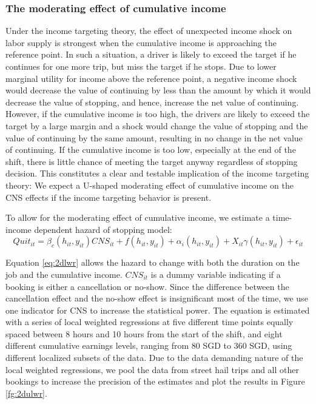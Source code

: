 \documentclass[reviewmode,AEJ]{AEA}
\begin{document}
\subsubsection{The moderating effect of cumulative income} Under the income targeting theory, the effect of unexpected income shock on labor supply is strongest when the cumulative income is approaching the reference point. In such a situation, a driver is likely to exceed the target if he continues for one more trip, but  miss the target if he stops. Due to lower marginal utility for income above the reference point, a negative income shock would decrease the value of continuing by less than the amount by which it would decrease the value of stopping, and hence, increase the net value of continuing. However, if %
the cumulative income is too high, the drivers are likely to exceed the target by a large margin and a shock would change the value of stopping and the value of continuing by the same amount, resulting in no change in the net value of continuing. If the cumulative income is too low, especially at the end of the shift, there is little chance of meeting the target anyway regardless of stopping decision. This constitutes a clear and testable implication of the income targeting theory: We expect a U-shaped moderating effect of cumulative income on the CNS effects if the income targeting behavior is present.

To allow for the moderating effect of cumulative income, we estimate a time-income dependent hazard of stopping model:
\begin{equation}
    \label{eq:2dlwr}
    Quit_{it} = \beta_c(h_{it}, y_{it}) {CNS}_{it} + f(h_{it}, y_{it}) + \alpha_{i}(h_{it}, y_{it}) + X_{it}\gamma(h_{it}, y_{it}) + \epsilon_{it}
\end{equation}

Equation \eqref{eq:2dlwr} allows the hazard to change with both the duration on the job and the cumulative income. $CNS_{it}$ is a dummy variable indicating if a booking is either a cancellation or no-show.  Since the difference between the cancellation effect and the no-show effect is insignificant most of the time, we 
use one indicator for CNS to increase the statistical power. The equation is estimated with a series of local weighted regressions at five different time points equally spaced between 8 hours and 10 hours from the start of the shift, and eight different cumulative earnings levels, ranging from 80 SGD to 360 SGD, using different localized subsets of the data.  
Due to the data demanding nature of the local weighted regressions, we  pool the data from street hail trips and all other bookings to increase the precision of the estimates and plot the results in Figure \ref{fg:2dulwr}.
\end{document}

